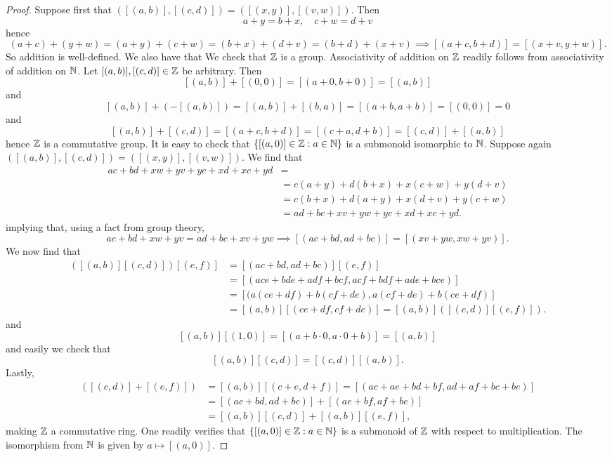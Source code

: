     \begin{proof}
        Suppose first that $([(a,b)],[(c,d)])=([(x,y)],[(v,w)])$. Then 
        $$a+y=b+x,\quad c+w=d+v$$
        hence
        $$(a+c)+(y+w)=(a+y)+(c+w)=(b+x)+(d+v)=(b+d)+(x+v) \implies [(a+c,b+d)]=[(x+v,y+w)].$$
        So addition is well-defined. We also have that  We check that $\mathbb{Z}$ is a group. Associativity of addition on $\mathbb{Z}$ readily follows from associativity of addition on $\mathbb{N}$. Let $[(a,b)],[(c,d)]\in\mathbb{Z}$ be arbitrary. Then 
        $$[(a,b)] + [(0,0)]= [(a+0,b+0)]=[(a,b)]$$
        and 
        $$[(a,b)]+(-[(a,b)])=[(a,b)]+[(b,a)]=[(a+b,a+b)] = [(0,0)]=0$$
        and 
        $$[(a,b)]+[(c,d)] = [(a+c,b+d)]=[(c+a,d+b)]=[(c,d)]+[(a,b)]$$
        hence $\mathbb{Z}$ is a commutative group. It is easy to check that $\{[(a,0)]\in \mathbb{Z}: a\in\mathbb{N}\}$ is a submonoid isomorphic to $\mathbb{N}$. Suppose again $([(a,b)],[(c,d)])=([(x,y)],[(v,w)])$. We find that
        \begin{align*}
            ac+bd+xw+yv+yc+xd+xc+yd &=\\
            &= c(a+y)+d(b+x)+x(c+w)+y(d+v)\\
            &= c(b+x)+d(a+y)+x(d+v)+y(c+w)\\
            &= ad+bc+xv+yw+yc+xd+xc+yd.
        \end{align*}
        implying that, using a fact from group theory,
        $$ac+bd+xw+yv=ad+bc+xv+yw \implies [(ac+bd,ad+bc)]=[(xv+yw,xw+yv)].$$
        We now find that
        \begin{align*}
            ([(a,b)][(c,d)])[(e,f)] &= [(ac+bd,ad+bc)][(e,f)]\\ &=[(ace+bde+adf+bcf,acf+bdf+ade+bce)]\\
            &= [(a(ce+df)+b(cf+de),a(cf+de)+b(ce+df)]\\
            &= [(a,b)][(ce+df,cf+de)] = [(a,b)]([(c,d)][(e,f)]).
        \end{align*}
        and
        $$[(a,b)][(1,0)]=[(a+b\cdot 0,a\cdot0+b)]=[(a,b)]$$
        and easily we check that
        $$[(a,b)][(c,d)]=[(c,d)][(a,b)].$$
        Lastly,
        \begin{align*}
            [(a,b)]([(c,d)]+[(e,f)]) &= [(a,b)][(c+e,d+f)]=[(ac+ae+bd+bf,ad+af+bc+be)]\\
            &= [(ac+bd,ad+bc)]+[(ae+bf,af+be)]\\
            &=[(a,b)][(c,d)]+[(a,b)][(e,f)],
        \end{align*}
        making $\mathbb{Z}$ a commutative ring.
        One readily verifies that $\{[(a,0)]\in\mathbb{Z}:a\in\mathbb{N}\}$ is a submonoid of $\mathbb{Z}$ with respect to multiplication. The isomorphism from $\mathbb{N}$ is given by $a\mapsto [(a,0)]$.
        \end{proof}
